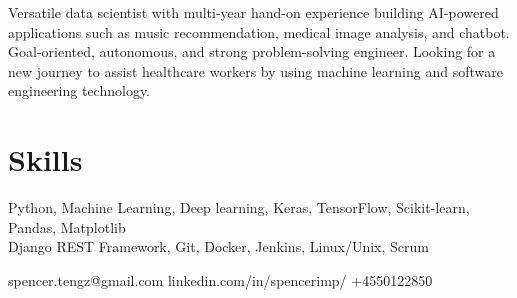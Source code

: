 \documentclass[11pt]{article} %
\begin{document}
{\noindent\begin{minipage}[t]{0.8\textwidth}
	\vspace{0.5em}
	Versatile data scientist with multi-year hand-on experience building AI-powered applications such as music recommendation, medical image analysis, and chatbot. Goal-oriented, autonomous, and strong problem-solving engineer. Looking for a new journey to assist healthcare workers by using machine learning and software engineering technology. 
\section{Skills}

Python, Machine Learning, Deep learning, Keras, TensorFlow, Scikit-learn, Pandas, Matplotlib \\
Django REST Framework, Git, Docker, Jenkins, Linux/Unix, Scrum \\
\end{minipage}\hspace{1mm}
\begin{minipage}[t]{0.2\textwidth}
spencer.tengz@gmail.com
linkedin.com/in/spencerimp/
+4550122850
\end{minipage}

}
\end{document}
